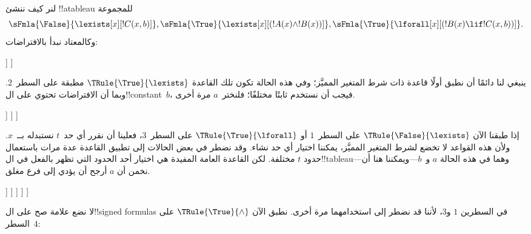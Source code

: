 \documentclass[../../../include/open-logic-section]{subfiles}
\begin{document}
\begin{ex}
لنر كيف ننشئ !!a{tableau} للمجموعة
\[
\sFmla{\False}{\lexists[x][!C(x,b)]},
\sFmla{\True}{\lexists[x][(!A(x) \land !B(x))]},
\sFmla{\True}{\lforall[x][(!B(x) \lif !C(x,b))]}.
\]
وكالمعتاد نبدأ بالافتراضات:
\begin{oltableau}
  [\sFmla{\False}{\lexists[x][\formula{C}(x,b)]}, just=\TAss
    [\sFmla{\True}{\lexists[x][(\formula{A}(x) \land \formula{B}(x))]},
      just=\TAss
      [\sFmla{\True}{\lforall[x][(\formula{B}(x) \lif \formula{C}(x,b))]},
        just=\TAss]
    ]
  ]
\end{oltableau}
ينبغي لنا دائمًا أن نطبق أولًا قاعدة ذات شرط المتغير المميَّز؛ وفي هذه الحالة
تكون تلك القاعدة $\TRule{\True}{\lexists}$ مطبقة على السطر~$2$.
وبما أن الافتراضات تحتوي على ال!!{constant}~$b$، فيجب أن نستخدم ثابتًا
مختلفًا؛ فلنختر~$a$ مرة أخرى.
\begin{oltableau}
  [\sFmla{\False}{\lexists[x][\formula{C}(x,b)]}, just=\TAss
    [\sFmla{\True}{\lexists[x][(\formula{A}(x) \land \formula{B}(x))]},
      just=\TAss, checked
      [\sFmla{\True}{\lforall[x][(\formula{B}(x) \lif \formula{C}(x,b))]},
        just=\TAss
        [\sFmla{\True}{\formula{A}(a) \land \formula{B}(a)},
          just={\TRule{\True}{\lexists}[2]}]
      ]
    ]
  ]
\end{oltableau}
إذا طبقنا الآن $\TRule{\False}{\lexists}$ على السطر~$1$ أو
$\TRule{\True}{\lforall}$ على السطر~$3$، فعلينا أن نقرر أي حد~$t$
نستبدله بــ~$x$. ولأن هذه القواعد لا تخضع لشرط المتغير المميَّز، يمكننا اختيار
أي حد نشاء. وقد نضطر في بعض الحالات إلى تطبيق القاعدة عدة مرات باستعمال حدود
$t$ مختلفة. لكن القاعدة العامة المفيدة هي اختيار أحد الحدود التي تظهر بالفعل
في ال!!{tableau}---وهما في هذه الحالة $a$ و~$b$---ويمكننا هنا أن نخمن أن
$a$ أرجح أن يؤدي إلى فرع مغلق.
\begin{oltableau}
  [\sFmla{\False}{\lexists[x][\formula{C}(x,b)]}, just=\TAss
    [\sFmla{\True}{\lexists[x][(\formula{A}(x) \land \formula{B}(x))]},
      just=\TAss, checked
      [\sFmla{\True}{\lforall[x][(\formula{B}(x) \lif \formula{C}(x,b))]}, just=\TAss
        [\sFmla{\True}{\formula{A}(a) \land \formula{B}(a)}, just={\TRule{\True}{\lexists}[2]}
          [\sFmla{\False}{\formula{C}(a,b)}, just={\TRule{\False}{\lexists}[1]}
            [\sFmla{\True}{\formula{B}(a) \lif \formula{C}(a,b)},
              just={\TRule{\True}{\lforall}[3]}
            ]
          ]
        ]
      ]
    ]
  ]
\end{oltableau}
لا نضع علامة صح على ال!!{signed formula}s في السطرين $1$ و$3$، لأننا قد
نضطر إلى استخدامهما مرة أخرى. نطبق الآن $\TRule{\True}{\land}$ على السطر~$4$:

\end{ex}
\end{document}
